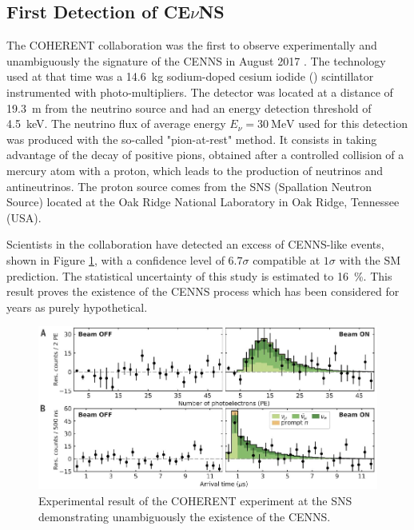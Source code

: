 \subsection{First Detection of CE$\nu$NS}

The COHERENT collaboration was the first to observe experimentally and unambiguously the signature of the CENNS in August 2017 \cite{Akimov:2017bs}.
The technology used at that time was a \SI{14.6}{\kg} sodium-doped cesium iodide () scintillator instrumented with photo-multipliers. The detector was located at a distance of \SI{19.3}{\m} from the neutrino source and had an energy detection threshold of \SI{4.5}{\kilo\eV}. The neutrino flux of average energy $E_{\nu} = \SI{30}{\mega\eV}$ used for this detection was produced with the so-called "pion-at-rest" method. It consists in taking advantage of the decay of positive pions, obtained after a controlled collision of a mercury atom with a proton, which leads to the production of neutrinos and antineutrinos. The proton source comes from the SNS (Spallation Neutron Source) located at the Oak Ridge National Laboratory in Oak Ridge, Tennessee (USA). 

Scientists in the collaboration have detected an excess of CENNS-like events, shown in Figure \ref{fig:coherent-result}, with a confidence level of $6.7\sigma$ compatible at $1\sigma$ with the SM prediction. The statistical uncertainty of this study is estimated to \SI{16}{\percent}. This result proves the existence of the CENNS process which has been considered for years as purely hypothetical.

\begin{figure}
\centering
\includegraphics [scale=1]{Figures/Introduction/coherent_result.pdf}
\caption{Experimental result of the COHERENT experiment at the SNS demonstrating unambiguously the existence of the CENNS.}
\label{fig:coherent-result}
\end{figure}

